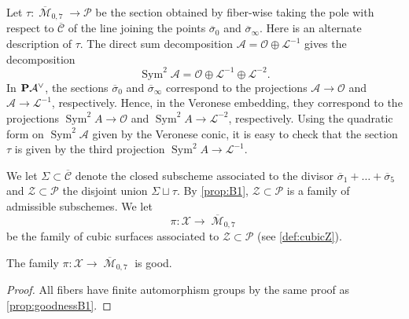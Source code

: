 \documentclass[reqno]{amsart}
\DeclareMathOperator{\M}{\mathcal{M}}
\renewcommand{\to}{{\longrightarrow}}
\renewcommand {\P}{{\bf P}}
\providecommand{\Sym}{\operatorname{Sym}}
\numberwithin{equation}{section}
\renewcommand{\O}{\mathcal{O}}
\begin{document}
Let $\tau \colon \overline{\M}_{0,7} \to \mathcal{P}$ be the section obtained by fiber-wise taking the pole with respect to $\overline {\mathcal{C}}$ of the line joining the points $\overline{\sigma}_0$ and $\overline{\sigma}_{\infty}$.
Here is an alternate description of $\tau$.
The direct sum decomposition $\mathcal{A} = \O \oplus \mathcal{L}^{-1}$ gives the decomposition
\[ \Sym^2 \mathcal{A} = \O \oplus \mathcal{L}^{-1} \oplus \mathcal{L}^{-2}.\]
In $\P \mathcal{A}^{\vee}$, the sections $\overline{\sigma}_0$ and $\overline{\sigma}_{\infty}$ correspond to the projections $\mathcal{A} \to \O$ and $\mathcal{A} \to \mathcal{L}^{-1}$, respectively.
Hence, in the Veronese embedding, they correspond to the projections $\Sym^2 A \to \O$ and $\Sym^2 A \to \mathcal{L}^{-2}$, respectively.
Using the quadratic form on $\Sym^2 \mathcal{A}$ given by the Veronese conic, it is easy to check that the section $\tau$ is given by the third projection $\Sym^2 A \to \mathcal{L}^{-1}$.

We let $\Sigma \subset \overline{\mathcal{C}}$ denote the closed subscheme associated to the divisor $\overline{\sigma}_1 + \dots + \overline{\sigma}_5$ and $\mathcal{Z} \subset \mathcal{P}$ the disjoint union $\Sigma \sqcup \tau$.
By \autoref{prop:B1}, $\mathcal{Z} \subset \mathcal{P}$ is a family of admissible subschemes.
We let
\[ \pi \colon \mathcal{X} \to \overline{\M}_{0,7}\]
be the family of cubic surfaces associated to $\mathcal{Z} \subset \mathcal{P}$ (see \autoref{def:cubicZ}).

\begin{proposition}  \label{prop:goodnessB2}
  The family $\pi \colon \mathcal{X} \to \overline{\M}_{0,7}$ is good.
\end{proposition}
\begin{proof}
  All fibers have finite automorphism groups by the same proof as \autoref{prop:goodnessB1}.
\end{proof}
\end{document}
